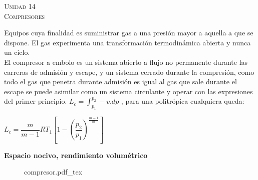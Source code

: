 \documentclass[11pt,a4paper,twocolumn]{article}
\newcommand{\unidad}[2]{\begin{center}
		\fontsize{10}{10}\selectfont\color{gray!50!black}\scshape Unidad #1 \\
		\fontsize{14}{14}\selectfont \scshape #2
\end{center}}
\begin{document}
		\unidad{14}{Compresores}
	Equipos cuya finalidad es suministrar gas a una presión mayor a aquella a que se dispone. El gas experimenta una transformación termodinámica abierta y nunca un ciclo.\\
	El compresor a embolo es un sistema abierto a flujo no permanente durante las carreras de admisión y escape, y un sistema cerrado durante la compresión, como todo el gas que penetra durante admisión es igual al gas que sale durante el escape se puede asimilar como un sistema circulante y operar con las expresiones del primer principio. $L_{c}=\int_{p_{1}}^{p_{2}} -v.dp$ , para una politrópica cualquiera queda:
	\begin{center}
			$L_{c} = \dfrac{m}{m-1} RT_{1} \left[  1- \left( \dfrac{p_{2}}{p_{1}}\right)  ^ {\frac{m-1}{m}} \right] $
	\end{center}
	\textbf{Espacio nocivo, rendimiento volumétrico}
	\begin{figure}[ht]
		\centering
		\def\svgwidth{0.3\textwidth}
		{compresor.pdf_tex}
	\end{figure}
\end{document}
